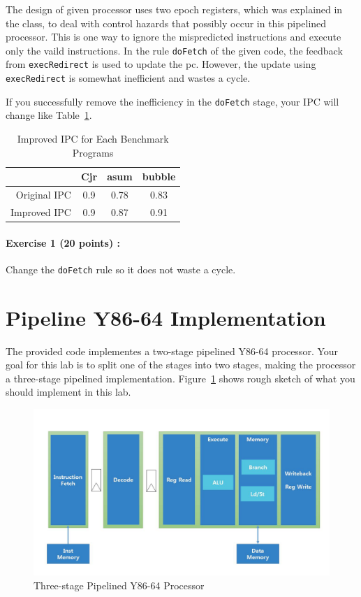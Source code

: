 \documentclass{article}
\begin{document}
The design of given processor uses two epoch registers, which was explained in the class,
to deal with control hazards that possibly occur in this pipelined processor.
This is one way to ignore the mispredicted instructions and execute only the vaild instructions.
In the rule \texttt{doFetch} of the given code, the feedback from
\texttt{execRedirect} is used to update the pc. However, the update
using \texttt{execRedirect} is somewhat inefficient and wastes a cycle.

If you successfully remove the inefficiency in the \texttt{doFetch} stage, your IPC will change like Table~\ref{table:ipcAfter}.
\begin{table}[h]
\centering
\begin{tabular}{|r|c|c|c|}
\hline
			 & Cjr & asum & bubble \\
\hline
Original IPC & 0.9 	 & 0.78  & 0.83 \\
Improved IPC & 0.9   & 0.87  & 0.91 \\
\hline
\end{tabular}
\caption{Improved IPC for Each Benchmark Programs}
\label{table:ipcAfter}
\end{table}

\noindent \paragraph{\bf Exercise 1 (20 points) :} Change the \texttt{doFetch} rule
so it does not waste a cycle. 

\section{Pipeline Y86-64 Implementation}

The provided code implementes a two-stage pipelined Y86-64 processor.
Your goal for this lab is to split one of the stages into two stages,
making the processor a three-stage pipelined implementation.
Figure~\ref{fig:3pipe_proc} shows rough sketch of what you should implement
in this lab.

\begin{figure}[htbp]
	\begin{center}
		\includegraphics[scale=0.3]{threeStage.jpg}
		\caption{Three-stage Pipelined Y86-64 Processor}
		\label{fig:3pipe_proc}
	\end{center}
\end{figure}
\end{document}
